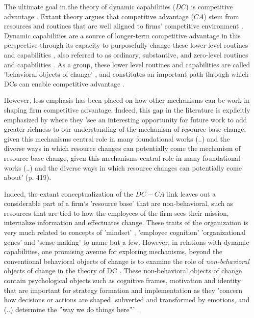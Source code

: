 \documentclass[review,fleqn]{elsarticle}\usepackage[]{graphicx}\usepackage[]{color}
\begin{document}
The ultimate goal in the theory of dynamic capabilities ($DC$) is competitive advantage
\citep{Schilke2014,Helfat2007,Protogerou2012,Li2014,Efrat2018a,Mikalef2017,Davcik2016a}. Extant
theory argues that competitive advantage ($CA$) stem from resources and routines that are
well aligned to firms’ competitive environment
\citep{Helfat2007,Peteraf2013,Teece1997,Li2014,Jantunen2018,Makkonen2014}. Dynamic
capabilities are a source of longer-term competitive advantage in this perspective through
its capacity to purposefully change these lower-level routines and capabilities
\citep{Winter2003,Helfat2011,Schilke2018,Pezeshkan2016b,Lin2014a}, also referred to as
ordinary, substantive, and zero-level routines and capabilities
\citep{Winter2003,Danneels2008,Collis1994}. As a group, these lower level routines and
capabilities are called 'behavioral objects of change' \citep{Verona2011,Zollo2016}, and constitutes an
important path through which DCs can enable competitive advantage \citep{Verona2011}.

However, less emphasis has been placed on how other mechanisms can be work in shaping firm
competitive advantage. Indeed, this gap in the literature is explicitly emphasized by
\citep{Schilke2018} where they 'see an interesting opportunity for future work to add
greater richness to our understanding of the mechanism of resource-base change, given this
mechanisms central role in many foundational works (..) and the diverse ways in which
resource changes can potentially come the mechanism of resource-base change, given this
mechanisms central role in many foundational works (..) and the diverse ways in which
resource changes can potentially come about' (p. 419).

Indeed, the extant conceptualization of the $DC-CA$ link leaves out a considerable part of
a firm‘s 'resource base' that are non-behavioral, such as resources that are tied to how
the employees of the firm sees their mission, internalize information and effectuates
change. These traits of the organization is very much related to concepts of 'mindset'
\citep{Dweck2016}, ’employee cognition’ \citep{Lakoff1987,Gavetti2012} 'organizational
genes' \citep{Nelson1982} and 'sense-making' \citep{Weick1995} to name but a few. However,
in relations with dynamic capabilities, one promising avenue for exploring mechanisms,
beyond the conventional behavioral objects of change is to examine the role of
\emph{non-behavioral} objects of change in the theory of DC \citep{Verona2011}. These
non-behavioral objects of change contain psychological objects such as cognitive frames,
motivation and identity that are important for strategy formation and implementation
\citep{Vince2011,Gavetti2012} as they 'concern how decisions or actions are shaped,
subverted and transformed by emotions, and (..) determine the ”way we do things here”'
\cite[p. 338]{Vince2011}.
\end{document}
